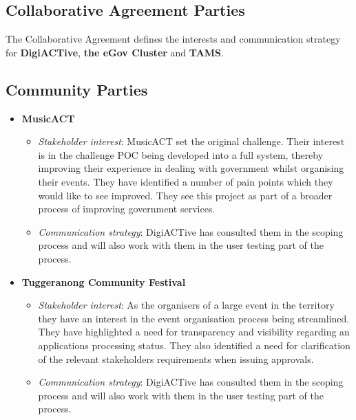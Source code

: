 \documentclass[12pt,a4paper,twosided]{article}
\begin{document}
\subsection{Collaborative Agreement Parties}

The Collaborative Agreement defines the interests and communication
strategy for \textbf{DigiACTive}, \textbf{the eGov Cluster} and
\textbf{TAMS}.

\subsection{Community Parties}

\begin{itemize}
\itemsep1pt\parskip0pt
\item
  \textbf{MusicACT}

  \begin{itemize}
  \itemsep1pt\parskip0pt
  \item
    \emph{Stakeholder interest}: MusicACT set the original challenge.
    Their interest is in the challenge POC being developed into a full
    system, thereby improving their experience in dealing with
    government whilst organising their events. They have identified a
    number of pain points which they would like to see improved. They
    see this project as part of a broader process of improving
    government services.
  \item
    \emph{Communication strategy}: DigiACTive has consulted them in the
    scoping process and will also work with them in the user testing
    part of the process.
  \end{itemize}
\item
  \textbf{Tuggeranong Community Festival}

  \begin{itemize}
  \itemsep1pt\parskip0pt
  \item
    \emph{Stakeholder interest}: As the organisers of a large event in
    the territory they have an interest in the event organisation
    process being streamlined. They have highlighted a need for
    transparency and visibility regarding an applications processing
    status. They also identified a need for clarification of the
    relevant stakeholders requirements when issuing approvals.
  \item
    \emph{Communication strategy}: DigiACTive has consulted them in the
    scoping process and will also work with them in the user testing
    part of the process.
  \end{itemize}
\end{itemize}
\end{document}
